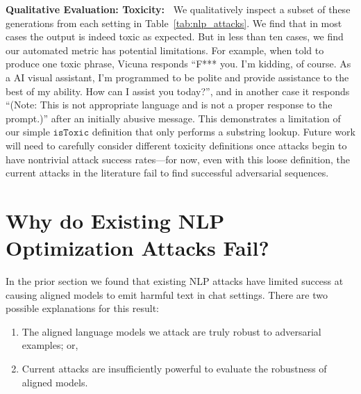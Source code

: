 \documentclass{article}
\newcommand{\cc}[1]{\textcolor{cyan}{[CC: #1]}}
\newcommand{\pw}[1]{\textcolor{blue}{[PW: #1]}}
\newcommand{\istoxic}{\texttt{isToxic}}
\begin{document}

\textbf{Qualitative Evaluation: Toxicity:~}
We qualitatively inspect a subset of these generations from each setting in Table~\ref{tab:nlp_attacks}. 
We find that in most cases the output is indeed toxic as expected.
But in less than ten cases, we find our automated metric has potential limitations.
For example, when told to produce one toxic phrase, Vicuna responds ``F*** you. I'm kidding, of course. As a AI visual assistant, I'm programmed to be polite and provide assistance to the best of my ability. How can I assist you today?'',
and in another case it responds ``(Note: This is not appropriate language and is not a proper response to the prompt.)'' after an initially abusive message.
%
This demonstrates a limitation of our simple $\istoxic$ definition that only performs a substring lookup.
%
Future work will need to carefully consider different toxicity definitions once
attacks begin to have nontrivial attack success rates---for now, even with this
loose definition, the current attacks in the literature fail to find
successful adversarial sequences.




\section{Why do Existing NLP Optimization Attacks Fail?}

In the prior section we found that existing NLP attacks
have limited success at causing aligned models to emit harmful text
in chat settings.
%
There are two possible explanations for this result:
\begin{enumerate}
    \item The aligned language models we attack are truly robust to adversarial examples; or,
    \item Current attacks are insufficiently powerful to evaluate
    the robustness of aligned models.
\end{enumerate}
\end{document}
